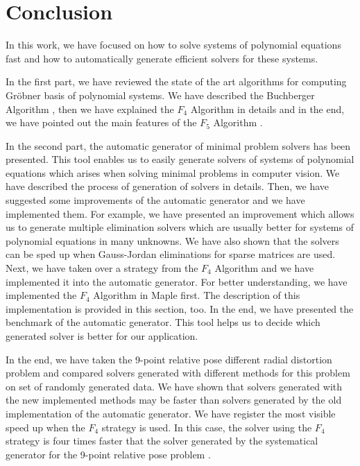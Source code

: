 \chapter{Conclusion}
In this work, we have focused on how to solve systems of polynomial equations fast and how to automatically generate efficient solvers for these systems.

In the first part, we have reviewed the state of the art algorithms for computing Gr\"obner basis of polynomial systems. We have described the Buchberger Algorithm \cite{Buchberger65}, then we have explained the $F_4$ Algorithm \cite{F4} in details and in the end, we have pointed out the main features of the $F_5$ Algorithm \cite{F5}.

In the second part, the automatic generator \cite{AutoGen} of minimal problem solvers has been presented. This tool enables us to easily generate solvers of systems of polynomial equations which arises when solving minimal problems in computer vision. We have described the process of generation of solvers in details. Then, we have suggested some improvements of the automatic generator and we have implemented them. For example, we have presented an improvement which allows us to generate multiple elimination solvers which are usually better for systems of polynomial equations in many unknowns. We have also shown that the solvers can be sped up when Gauss-Jordan eliminations for sparse matrices are used. Next, we have taken over a strategy from the $F_4$ Algorithm \cite{F4} and we have implemented it into the automatic generator. For better understanding, we have implemented the $F_4$ Algorithm \cite{F4} in Maple first. The description of this implementation is provided in this section, too. In the end, we have presented the benchmark of the automatic generator. This tool helps us to decide which generated solver is better for our application.

In the end, we have taken the 9-point relative pose different radial distortion problem \cite{9pt} and compared solvers generated with different methods for this problem on set of randomly generated data. We have shown that solvers generated with the new implemented methods may be faster than solvers generated by the old implementation of the automatic generator. We have register the most visible speed up when the $F_4$ strategy is used. In this case, the solver using the $F_4$ strategy is four times faster that the solver generated by the systematical generator for the 9-point relative pose problem \cite{9pt}.
